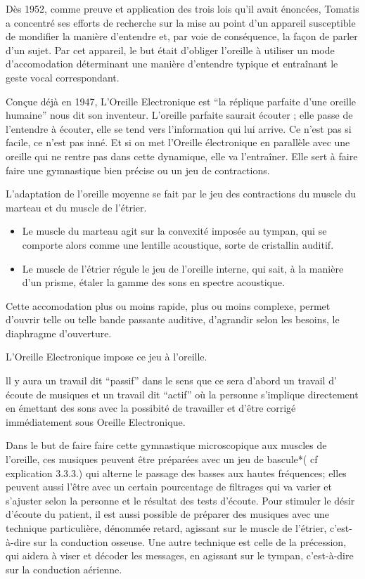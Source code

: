 \documentclass[12pt,french]{report}
\makeatletter
\let\SF@@footnote\footnote
\def\footnote{\ifx\protect\@typeset@protect
    \expandafter\SF@@footnote
  \else
    \expandafter\SF@gobble@opt
  \fi
}
\edef\SF@gobble@opt{\noexpand\protect
  \expandafter\noexpand\csname SF@gobble@opt \endcsname}
\makeatother
\begin{document}
Dès 1952, comme preuve et application des trois lois qu'il avait énoncées,
Tomatis a concentré ses efforts de recherche sur la mise au point
d'un appareil susceptible de mondifier la manière d'entendre et, par
voie de conséquence, la façon de parler d'un sujet. Par cet appareil,
le but était d'obliger l'oreille à utiliser un mode d'accomodation
déterminant une manière d'entendre typique et entraînant le geste
vocal correspondant.

Conçue déjà en 1947, L'Oreille Electronique est ``la réplique parfaite
d'une oreille humaine'' nous dit son inventeur. L'oreille parfaite
saurait écouter ; elle passe de l'entendre à écouter, elle se tend
vers l'information qui lui arrive. Ce n'est pas si facile, ce n'est
pas inné. Et si on met l'Oreille électronique en parallèle avec une
oreille qui ne rentre pas dans cette dynamique, elle va l'entraîner.
Elle sert à faire faire une gymnastique bien précise ou un jeu de
contractions.

L'adaptation de l'oreille moyenne se fait par le jeu des contractions
du muscle du marteau et du muscle de l'étrier.
\begin{itemize}
\item Le muscle du marteau agit sur la convexité imposée au tympan, qui
se comporte alors comme une lentille acoustique, sorte de cristallin
auditif.
\item Le muscle de l'étrier régule le jeu de l'oreille interne, qui sait,
à la manière d'un prisme, étaler la gamme des sons en spectre acoustique.
\end{itemize}
Cette accomodation plus ou moins rapide, plus ou moins complexe, permet
d'ouvrir telle ou telle bande passante auditive, d'agrandir selon
les besoins, le diaphragme d'ouverture.

L'Oreille Electronique impose ce jeu à l'oreille.

ll y aura un travail dit ``passif'' dans le sens que ce sera d'abord
un travail d' écoute de musiques et un travail dit ``actif'' où
la personne s'implique directement en émettant des sons avec la possibité
de travailler et d'être corrigé immédiatement sous Oreille Electronique.

Dans le but de faire faire cette gymnastique microscopique aux muscles
de l'oreille, ces musiques peuvent être préparées avec un jeu de bascule{*}(
cf explication 3.3.3.) qui alterne le passage des basses aux hautes
fréquences; elles peuvent aussi l'être avec un certain pourcentage
de filtrages \footnote{}qui va varier et s'ajuster selon la personne
et le résultat des tests d'écoute. Pour stimuler le désir d'écoute
du patient, il est aussi possible de préparer des musiques avec une
technique particulière, dénommée retard, agissant sur le muscle de
l'étrier, c'est-à-dire sur la conduction osseuse. Une autre technique
est celle de la précession, qui aidera à viser et décoder les messages,
en agissant sur le tympan, c'est-à-dire sur la conduction aérienne. 
\end{document}
